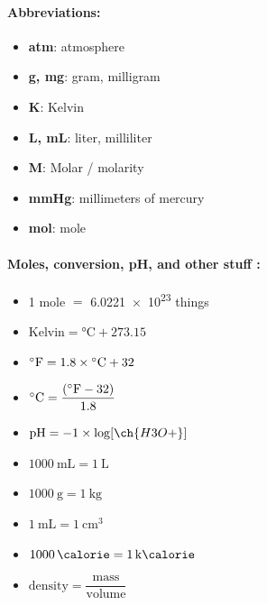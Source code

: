 \documentclass[9pt]{article}
\begin{document}
%
\newpage
{}
\begin{multicols}{2}
    \paragraph{\textsf{Abbreviations:}}
    \begin{itemize}
        \item \textbf{atm}: atmosphere
        \item \textbf{g, mg}: gram, milligram
        \item \textbf{K}: Kelvin
        \item \textbf{L, mL}: liter, milliliter
        \item \textbf{\textsc{M}}: Molar / molarity
        \item \textbf{mmHg}: millimeters of mercury
        \item \textbf{mol}: mole
    \end{itemize}
    \vspace{0.5cm}

    \paragraph{\textsf{Moles, conversion, pH, and other stuff : \newline}}

    \begin{itemize}
        \item 1 mole \( = \) \num{6.0221e23} things
        \item \( \textrm{Kelvin} = \si{\degreeCelsius} + \num{273.15} \)
        \item \( \textrm{\degree F} = 1.8 \times \si{\degreeCelsius} + \num{32} \)
        \item \( \si{\degreeCelsius} = \dfrac{(\textrm{\degree F} - \num{32})}{\num{1.8}} \)
        \item \( \textrm{pH} = \num{-1} \times  \log [\ch{H3O+}] \)
        \item \( \SI{1000}{\milli \liter} = \SI{1}{\liter} \)
        \item \( \SI{1000}{\gram} = \SI{1}{\kilo \gram} \)
        \item \( \SI{1}{\milli \liter} = \SI{1}{\centi \meter \cubed} \)
        \item \( \SI{1000}{\calorie} = \SI{1}{\kilo \calorie} \)
        \item \( \text{density} = \dfrac{\text{mass}}{\text{volume}}\)
    \end{itemize}
    \vspace{0.5cm}



\end{multicols}
\end{document}
